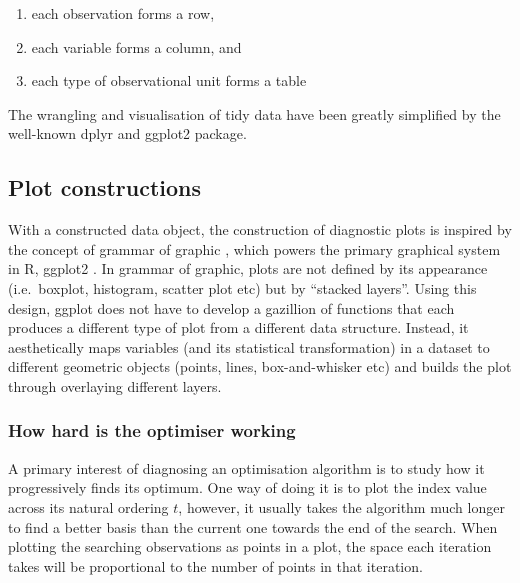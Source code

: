 \documentclass[12pt]{article}
\providecommand{\tightlist}{%
  \setlength{\itemsep}{0pt}\setlength{\parskip}{0pt}}
\begin{document}
\begin{enumerate}
\def\labelenumi{\arabic{enumi})}
\tightlist
\item
  each observation forms a row,
\item
  each variable forms a column, and
\item
  each type of observational unit forms a table
\end{enumerate}

The wrangling and visualisation of tidy data have been greatly
simplified by the well-known dplyr\citep{dplyr} and
ggplot2\citep{ggplot2} package.

\newpage

\hypertarget{plot-constructions}{%
\subsection{Plot constructions}\label{plot-constructions}}

With a constructed data object, the construction of diagnostic plots is
inspired by the concept of grammar of graphic
\citep{wickham2010layered}, which powers the primary graphical system in
R, ggplot2 \citep{ggplot2}. In grammar of graphic, plots are not defined
by its appearance (i.e.~boxplot, histogram, scatter plot etc) but by
``stacked layers''. Using this design, ggplot does not have to develop a
gazillion of functions that each produces a different type of plot from
a different data structure. Instead, it aesthetically maps variables
(and its statistical transformation) in a dataset to different geometric
objects (points, lines, box-and-whisker etc) and builds the plot through
overlaying different layers.

\hypertarget{how-hard-is-the-optimiser-working}{%
\subsubsection{How hard is the optimiser
working}\label{how-hard-is-the-optimiser-working}}

A primary interest of diagnosing an optimisation algorithm is to study
how it progressively finds its optimum. One way of doing it is to plot
the index value across its natural ordering \(t\), however, it usually
takes the algorithm much longer to find a better basis than the current
one towards the end of the search. When plotting the searching
observations as points in a plot, the space each iteration takes will be
proportional to the number of points in that iteration.
\end{document}
